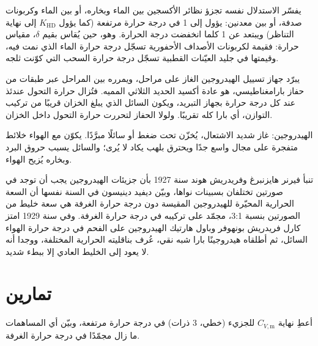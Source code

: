 يفسّر الاستدلال نفسه تجزؤ نظائر الأكسجين بين الماء
وبخاره، أو بين الماء وكربونات صدفة، أو بين معدنين:
 يؤول إلى 1 في درجة حرارة مرتفعة (كما
يؤول $K_{\mathrm{HD}}$ إلى نهاية التناظر) ويبتعد عن 1 كلما انخفضت درجة الحرارة.
وهو، حين يُقاس بقيم $\delta$، مقياس حرارة: فقيمة  لكربونات
الأصداف الأحفورية تسجّل درجة حرارة الماء الذي نمت فيه، 
وقيمتها في جليد العيّنات القطبية تسجّل درجة حرارة السحب التي كوّنت
ثلجه.

\begin{inthelab}
يبرّد جهاز تسييل الهيدروجين الغاز على مراحل، ويمرره بين المراحل
عبر طبقات من حفاز بارامغناطيسي، هو عادة أكسيد الحديد الثلاثي المميه.
فتُزال حرارة التحول عندئذ عند كل درجة حرارة بجهاز التبريد،
ويكون السائل الذي يبلغ الخزان قريبًا من تركيب التوازن،
أي بارا كله تقريبًا. ولولا الحفاز لتحررت حرارة التحول
داخل الخزان.
\end{inthelab}

\begin{safety}{}
الهيدروجين: غاز شديد الاشتعال، يُخزّن تحت ضغط أو سائلًا
مبرَّدًا. يكوّن مع الهواء خلائط متفجرة على مجال واسع جدًا ويحترق
بلهب يكاد لا يُرى؛ والسائل يسبب حروق البرد وبخاره
يُزيح الهواء.
\end{safety}

\begin{history}[الهيدروجينان، 1927--1929]
تنبأ فيرنر هايزنبرغ وفريدريش هوند سنة 1927 بأن جزيئات الهيدروجين
يجب أن توجد في صورتين تختلفان بسبينات نواها، وبيّن ديفيد دينيسون
في السنة نفسها أن السعة الحرارية المحيّرة للهيدروجين المقيسة
دون درجة حرارة الغرفة هي سعة خليط من الصورتين بنسبة 3:1، مجمّد على
تركيبه في درجة حرارة الغرفة. وفي سنة 1929 امتز كارل فريدريش بونهوفر وباول
هارتيك الهيدروجين على الفحم في درجة حرارة الهواء السائل، ثم أطلقاه
هيدروجينًا بارا شبه نقي، عُرف بناقليته الحرارية المختلفة،
ووجدا أنه لا يعود إلى الخليط العادي إلا ببطء شديد.
\end{history}

\section{تمارين}

\begin{exercise}[$\star$]\label{exo:b3:statistical-thermo-applied:1}
أعطِ نهاية $C_{V,\mathrm m}$ للجزيء  (خطي، 3 ذرات) في درجة حرارة مرتفعة، وبيّن
أي المساهمات ما زال مجمّدًا في درجة حرارة الغرفة.
\end{exercise}

